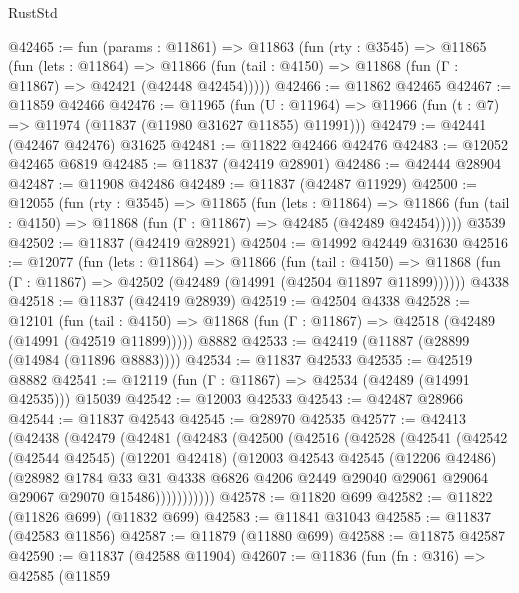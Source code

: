 \begin{lexlean}{RustStd}
\begin{coremodule}
@42465 := fun (params : @11861) =>
  @11863
    (fun (rty : @3545) =>
    @11865
      (fun (lets : @11864) =>
      @11866 (fun (tail : @4150) => @11868 (fun (Γ : @11867) => @42421 (@42448 @42454)))))
@42466 := @11862 @42465
@42467 := @11859 @42466
@42476 := @11965
    (fun (U : @11964) => @11966 (fun (t : @7) => @11974 (@11837 (@11980 @31627 @11855) @11991)))
@42479 := @42441 (@42467 @42476) @31625
@42481 := @11822 @42466 @42476
@42483 := @12052 @42465 @6819
@42485 := @11837 (@42419 @28901)
@42486 := @42444 @28904
@42487 := @11908 @42486
@42489 := @11837 (@42487 @11929)
@42500 := @12055
    (fun (rty : @3545) =>
    @11865
      (fun (lets : @11864) =>
      @11866 (fun (tail : @4150) => @11868 (fun (Γ : @11867) => @42485 (@42489 @42454)))))
    @3539
@42502 := @11837 (@42419 @28921)
@42504 := @14992 @42449 @31630
@42516 := @12077
    (fun (lets : @11864) =>
    @11866
      (fun (tail : @4150) =>
      @11868 (fun (Γ : @11867) => @42502 (@42489 (@14991 (@42504 @11897 @11899))))))
    @4338
@42518 := @11837 (@42419 @28939)
@42519 := @42504 @4338
@42528 := @12101
    (fun (tail : @4150) => @11868 (fun (Γ : @11867) => @42518 (@42489 (@14991 (@42519 @11899)))))
    @8882
@42533 := @42419 (@11887 (@28899 (@14984 (@11896 @8883))))
@42534 := @11837 @42533
@42535 := @42519 @8882
@42541 := @12119 (fun (Γ : @11867) => @42534 (@42489 (@14991 @42535))) @15039
@42542 := @12003 @42533
@42543 := @42487 @28966
@42544 := @11837 @42543
@42545 := @28970 @42535
@42577 := @42413
    (@42438
      (@42479
        (@42481
          (@42483
            (@42500
              (@42516
                (@42528
                  (@42541
                    (@42542
                      (@42544 @42545)
                      (@12201 @42418)
                      (@12003
                        @42543
                        @42545
                        (@12206 @42486)
                        (@28982
                          @1784
                          @33
                          @31
                          @4338
                          @6826
                          @4206
                          @2449
                          @29040
                          @29061
                          @29064
                          @29067
                          @29070
                          @15486)))))))))))
@42578 := @11820 @699
@42582 := @11822 (@11826 @699) (@11832 @699)
@42583 := @11841 @31043
@42585 := @11837 (@42583 @11856)
@42587 := @11879 (@11880 @699)
@42588 := @11875 @42587
@42590 := @11837 (@42588 @11904)
@42607 := @11836
    (fun (fn : @316) =>
    @42585
      (@11859

\end{coremodule}
\end{lexlean}
